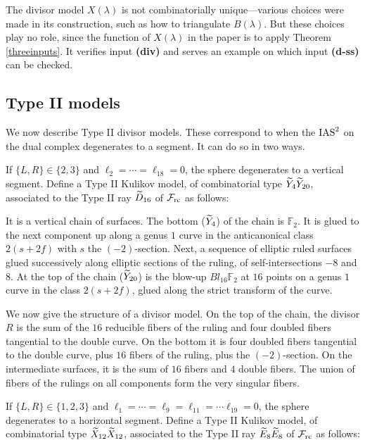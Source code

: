 \documentclass[table,x11names]{amsart}
\begin{document}
  \begin{remark} The divisor model $X(\lambda)$ is not combinatorially unique---various
  choices were made in its construction, such as how to triangulate $B(\lambda)$. But
  these choices play no role, since the function of $X(\lambda)$ in the paper is to
  apply Theorem \ref{threeinputs}. It verifies
  input {\bf (div)} and serves an example on which input {\bf (d-ss)} can be checked.
  \end{remark}

\subsection{Type II models}
\label{sec:type-ii}

We now describe Type II divisor models. These correspond to when
the $\operatorname{IAS}^2$ on the dual complex degenerates to a segment. It can do
so in two ways.

If $\{L,R\}\in \{2,3\}$ and
$\ell_2=\cdots = \ell_{18}=0$, the sphere degenerates to a vertical segment.
Define a Type II Kulikov model, of combinatorial type ${\widetilde Y}_4{\widetilde Y}_{20}$, 
associated to the Type II ray ${\widetilde D}_{16}$ of ${\mathcal F}_{\rm rc}$
as follows:

It is a vertical chain of surfaces. The bottom (${\widetilde Y}_4$)
of the chain is $\mathbb{F}_2$.
It is glued to the next component up along a genus $1$ curve in the
anticanonical class $2(s+2f)$ with $s$ the $(-2)$-section.
Next, a sequence of elliptic ruled surfaces glued successively along
elliptic sections of the ruling, of self-intersections $-8$ and $8$. 
At the top of the chain (${\widetilde Y}_{20}$)
is the blow-up $Bl_{16}\mathbb{F}_2$ at $16$ points on a
genus $1$ curve in the class $2(s+2f)$, glued along the strict transform of the
curve.

We now give the structure of a divisor model.
On the top of the chain, the divisor $R$
is the sum of the $16$ reducible fibers of the ruling and
four doubled fibers tangential to the double curve. On the bottom
it is four doubled fibers tangential to the double curve, plus $16$ fibers
of the ruling, plus the $(-2)$-section. On the intermediate surfaces,
it is the sum of $16$ fibers and $4$ double fibers.
The union of fibers of the rulings on all components 
form the very singular fibers. 

If $\{L,R\}\in\{1,2,3\}$ and $\ell_1=\cdots = \ell_9=\ell_{11}=\cdots \ell_{19}=0$,
the sphere degenerates to a
horizontal segment. Define a Type II Kulikov model, of combinatorial type
${\widetilde X}_{12}{\widetilde X}_{12}$, associated to the Type II ray ${\widetilde E}_8{\widetilde E}_8$ of ${\mathcal F}_{\rm rc}$
as follows:
\end{document}
